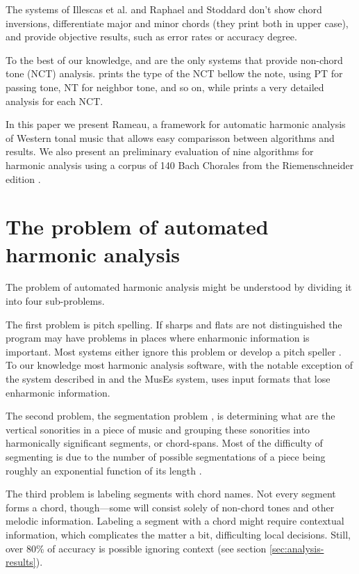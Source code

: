 \documentclass{article}
\begin{document}
The systems of Illescas et al. \cite{illescas.ea:harmonic} and Raphael
and Stoddard \cite{raphael.ea:harmonic} don't show chord inversions,
differentiate major and minor chords (they print both in upper case),
and provide objective results, such as error rates or accuracy degree.

To the best of our knowledge, \cite{illescas.ea:harmonic} and
\cite{taube:automatic} are the only systems that provide non-chord
tone (NCT) analysis. \cite{taube:automatic} prints the type of the NCT
bellow the note, using PT for passing tone, NT for neighbor tone, and
so on, while \cite{illescas.ea:harmonic} prints a very detailed
analysis for each NCT.

In this paper we present Rameau, a framework for automatic harmonic
analysis of Western tonal music that allows easy comparisson between
algorithms and results. We also present an preliminary evaluation of
nine algorithms for harmonic analysis using a corpus of 140 Bach
Chorales from the Riemenschneider edition \cite{bach:371}.

\section{The problem of automated harmonic analysis}
\label{sec:problem}

The problem of automated harmonic analysis might be understood by
dividing it into four sub-problems. 

The first problem is pitch spelling. If sharps and flats are not
distinguished the program may have problems in places where enharmonic
information is important. Most systems either ignore this problem or
develop a pitch speller \cite{temperley.ea:modeling}. To our knowledge
most harmonic analysis software, with the notable exception of the
system described in \cite{illescas.ea:harmonic} and the MusEs
\cite{pachet.ea:representing} system, uses input formats that lose
enharmonic information.

The second problem, the segmentation problem
\cite{pardo.ea:automated}, is determining what are the vertical
sonorities in a piece of music and grouping these sonorities into
harmonically significant segments, or chord-spans. Most of the
difficulty of segmenting is due to the number of possible
segmentations of a piece being roughly an exponential function of its
length \cite{pardo.ea:algorithms}.

The third problem is labeling segments with chord names. Not every
segment forms a chord, though---some will consist solely of non-chord
tones and other melodic information. Labeling a segment with a chord might
require contextual information, which complicates the matter a bit,
difficulting local decisions. Still, over 80\% of accuracy is possible
ignoring context (see section \ref{sec:analysis-results}).
\end{document}
